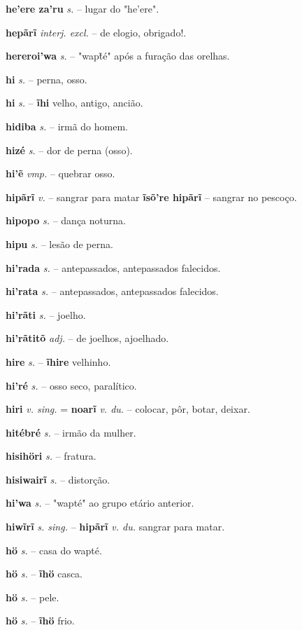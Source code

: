 \textbf{he'ere za'ru} \textit{s.} -- lugar do "he'ere".

\textbf{hepãrĩ} \textit{interj. excl.} -- de elogio, obrigado!.

\textbf{hereroi'wa} \textit{s.} -- "wapt̃é" após a furação das orelhas.

\textbf{hi} \textit{s.} -- perna, osso.

\textbf{hi} \textit{s.} -- \textbf{ĩhi} velho, antigo, ancião.

\textbf{hidiba} \textit{s.} -- irmã do homem.

\textbf{hizé} \textit{s.} -- dor de perna (osso).

\textbf{hi'ẽ} \textit{vmp.} -- quebrar osso.

\textbf{hipãrĩ} \textit{v.} -- sangrar para matar  \textbf{ĩsõ're hipãrĩ} -- sangrar no pescoço.

\textbf{hipopo} \textit{s.} -- dança noturna.

\textbf{hipu} \textit{s.} -- lesão de perna.

\textbf{hi'rada} \textit{s.} -- antepassados, antepassados falecidos.

\textbf{hi'rata} \textit{s.} -- antepassados, antepassados falecidos.

\textbf{hi'rãti} \textit{s.} -- joelho.

\textbf{hi'rãtitõ} \textit{adj.} -- de joelhos, ajoelhado.

\textbf{hire} \textit{s.} -- \textbf{ĩhire} velhinho.

\textbf{hi'ré} \textit{s.} -- osso seco, paralítico.

\textbf{hiri} \textit{v. sing.} = \textbf{noarĩ} \textit{v. du.} -- colocar, pôr, botar, deixar.

\textbf{hitébré} \textit{s.} -- irmão da mulher.

\textbf{hisihöri} \textit{s.} -- fratura.

\textbf{hisiwairĩ} \textit{s.} -- distorção.

\textbf{hi'wa} \textit{s.} -- "wapté" ao grupo etário anterior.

\textbf{hiwĩrĩ} \textit{s. sing.} -- \textbf{hipãrĩ} \textit{v. du.} sangrar para matar.

\textbf{hö} \textit{s.} -- casa do wapté.

\textbf{hö} \textit{s.} -- \textbf{ĩhö} casca.

\textbf{hö} \textit{s.} -- pele.

\textbf{hö} \textit{s.} -- \textbf{ĩhö} frio.

